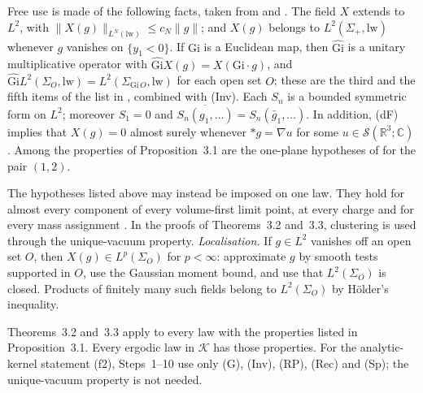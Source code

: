 \documentclass[11pt]{amsart}
\theoremstyle{definition}
\begin{document}
Free use is made of the following facts, taken from \cite[Lemma~14.3\,(a), (b)]{QEDII} and \cite[Section~8.1.2]{QEDI}.
The field $X$ extends to $L^2$, with $\|X(g)\|_{L^N(\mathrm{lw})}\le c_N\|g\|$; and $X(g)$ belongs to $L^2(\Sigma_+,\mathrm{lw})$ whenever $g$ vanishes on $\{y_1<0\}$.
If $\mathrm{Gi}$ is a Euclidean map, then $\widehat{\mathrm{Gi}}$ is a unitary multiplicative operator with $\widehat{\mathrm{Gi}}X(g)=X(\mathrm{Gi}\cdot g)$, and $\widehat{\mathrm{Gi}}L^2(\Sigma_O,\allowbreak \mathrm{lw})=\allowbreak L^2(\Sigma_{\mathrm{Gi}\,O},\allowbreak \mathrm{lw})$ for each open set $O$; these are the third and the fifth items of the list in \cite{QEDI}, combined with (Inv).
Each $S_n$ is a bounded symmetric form on $L^2$; moreover $S_1=0$ and $\overline{S_n(g_1,\dots)}=S_n(\bar g_1,\dots)$.
In addition, (dF) implies that $X(g)=0$ almost surely whenever $\ast g=\nabla u$ for some $u\in\mathcal S(\mathbb R^3;\mathbb C)$ \cite[Definition~14.2\,(a)]{QEDII}.
Among the properties of Proposition~3.1 are the one-plane hypotheses of \cite[Definition~14.2\,(f)]{QEDII} for the pair $(1,2)$.


The hypotheses listed above may instead be imposed on one law.
They hold for almost every component of every volume-first limit
point, at every charge and for every mass assignment
\cite[Theorems~1.3 and~1.4]{QEDII}. In the proofs of Theorems~3.2
and~3.3, clustering is used through the unique-vacuum property.
\emph{Localisation.} If $g\in L^2$ vanishes off an open set $O$,
then $X(g)\in L^p(\Sigma_O)$ for $p<\infty$: approximate $g$ by smooth
tests supported in $O$, use the Gaussian moment bound, and use that
$L^2(\Sigma_O)$ is closed. Products of finitely many such fields
belong to $L^2(\Sigma_O)$ by H\"older's inequality.

Theorems~3.2 and~3.3 apply to every law with the properties listed in
Proposition~3.1. Every ergodic law in $\mathcal K$ has those properties.
For the analytic-kernel statement (f2), Steps~1--10 use only (G),
(Inv), (RP), (Rec) and (Sp); the unique-vacuum property is not needed.
\end{document}
